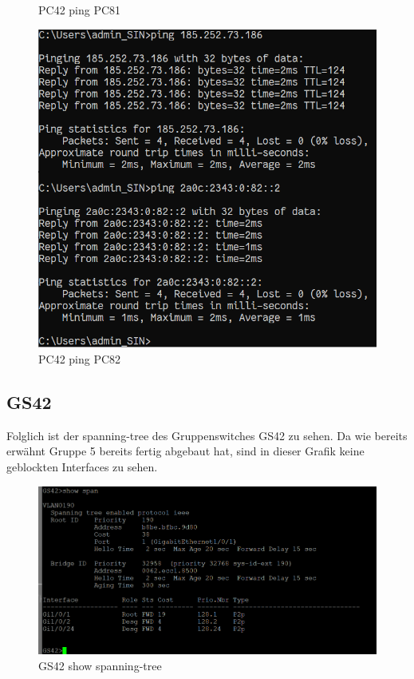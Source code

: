 \documentclass{article}
\begin{document}
\begin{figure}[!htp]
\begin{minipage}[b]{0.25\textwidth}
    \caption{PC42 ping PC81}
  \end{minipage}
  \hspace{0.8cm}
  \begin{minipage}[b]{0.25\textwidth}
    \includegraphics[width=\textwidth]{Arbeitsergebnisse/pc42/pc42_ping_pc82.PNG}
    \caption{PC42 ping PC82}
  \end{minipage}
\end{figure}

\pagebreak

\subsection{GS42}
Folglich ist der spanning-tree des Gruppenswitches GS42 zu sehen. Da wie bereits erwähnt Gruppe 5 bereits fertig abgebaut hat, sind in dieser Grafik keine geblockten Interfaces zu sehen.\\
\begin{figure}[!htp]
  \centering
  \begin{minipage}[b]{0.90\textwidth}
    \includegraphics[width=\textwidth]{Arbeitsergebnisse/gs42/gs42_span.png}
    \caption{GS42 show spanning-tree}
  \end{minipage}
\end{figure}
\end{document}
